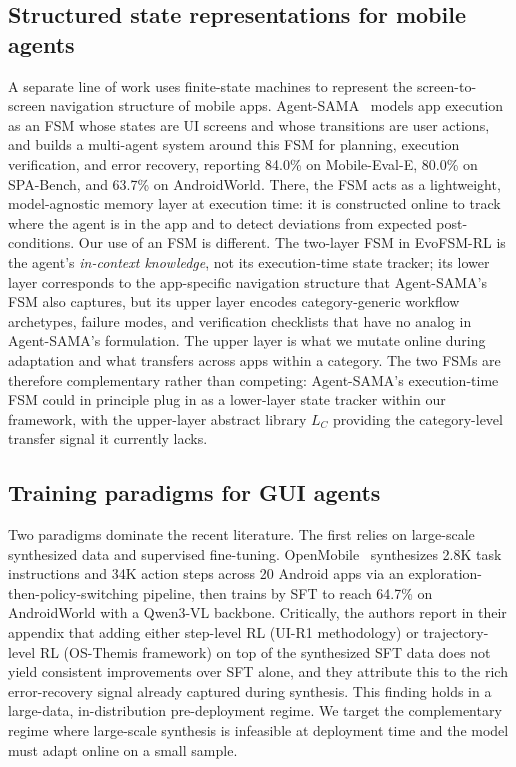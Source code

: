 \subsection{Structured state representations for mobile agents}

A separate line of work uses finite-state machines to represent the screen-to-screen navigation structure of mobile apps. Agent-SAMA~\citep{guo2025agentsama} models app execution as an FSM whose states are UI screens and whose transitions are user actions, and builds a multi-agent system around this FSM for planning, execution verification, and error recovery, reporting 84.0\% on Mobile-Eval-E, 80.0\% on SPA-Bench, and 63.7\% on AndroidWorld. There, the FSM acts as a lightweight, model-agnostic memory layer at execution time: it is constructed online to track where the agent is in the app and to detect deviations from expected post-conditions. Our use of an FSM is different. The two-layer FSM in EvoFSM-RL is the agent's \emph{in-context knowledge}, not its execution-time state tracker; its lower layer corresponds to the app-specific navigation structure that Agent-SAMA's FSM also captures, but its upper layer encodes category-generic workflow archetypes, failure modes, and verification checklists that have no analog in Agent-SAMA's formulation. The upper layer is what we mutate online during adaptation and what transfers across apps within a category. The two FSMs are therefore complementary rather than competing: Agent-SAMA's execution-time FSM could in principle plug in as a lower-layer state tracker within our framework, with the upper-layer abstract library $L_C$ providing the category-level transfer signal it currently lacks.

\subsection{Training paradigms for GUI agents}

Two paradigms dominate the recent literature. The first relies on large-scale synthesized data and supervised fine-tuning. OpenMobile~\citep{openmobile2026} synthesizes 2.8K task instructions and 34K action steps across 20 Android apps via an exploration-then-policy-switching pipeline, then trains by SFT to reach 64.7\% on AndroidWorld with a Qwen3-VL backbone. Critically, the authors report in their appendix that adding either step-level RL (UI-R1 methodology) or trajectory-level RL (OS-Themis framework) on top of the synthesized SFT data does not yield consistent improvements over SFT alone, and they attribute this to the rich error-recovery signal already captured during synthesis. This finding holds in a large-data, in-distribution pre-deployment regime. We target the complementary regime where large-scale synthesis is infeasible at deployment time and the model must adapt online on a small sample.

